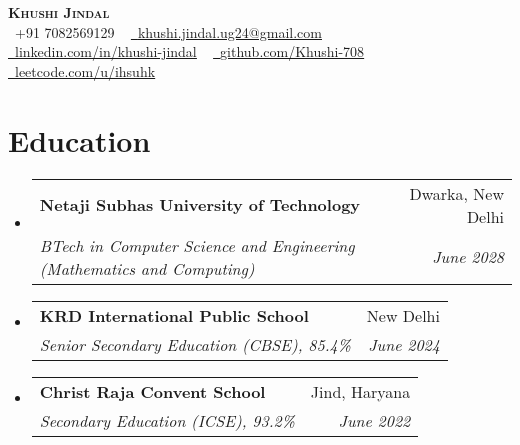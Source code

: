 \documentclass[letterpaper,11pt]{article}
\makeatletter
\newcommand{\resumeSubheading}[4]{
  \vspace{-2pt}\item
    \begin{tabular*}{0.97\textwidth}[t]{l@{\extracolsep{\fill}}r}
      \textbf{#1} & #2 \\
      \textit{\small#3} & \textit{\small #4} \\
    \end{tabular*}\vspace{-7pt}
}
\newcommand{\resumeSubHeadingListStart}{\begin{itemize}[leftmargin=0.15in, label={}]}
\newcommand{\resumeItemListEnd}{\end{itemize}\vspace{-5pt}}
\makeatother
\begin{document}


\begin{center}
  {\textbf{\Huge \scshape Khushi Jindal}} \\ \vspace{5pt}
  \small 
  \raisebox{-0.1\height}\faPhone\ +91 7082569129 ~
  \href{mailto:khushi.jindal.ug24@gmail.com}{\raisebox{-0.2\height}\faEnvelope\  \underline{khushi.jindal.ug24@gmail.com}}  \\ \vspace{3pt} %
  \href{https://www.linkedin.com/in/khushi-jindal}{\raisebox{-0.2\height}\faLinkedin\ \underline{linkedin.com/in/khushi-jindal}} ~
  \href{https://github.com/Khushi-708}{\raisebox{-0.2\height}\faGithub\ \underline{github.com/Khushi-708}} ~
  \href{https://leetcode.com/u/ihsuhk/}{\raisebox{-0.2\height}\faCode\ \underline{leetcode.com/u/ihsuhk}}
  \vspace{-8pt}
\end{center}

\section{Education}
  \resumeSubHeadingListStart
    \resumeSubheading
      {Netaji Subhas University of Technology}{Dwarka, New Delhi}
      {BTech in Computer Science and Engineering (Mathematics and Computing)}{June 2028}
    \resumeSubheading
      {KRD International Public School}{New Delhi}
      {Senior Secondary Education (CBSE), 85.4\%}{June 2024}
    \resumeSubheading
      {Christ Raja Convent School}{Jind, Haryana}
      {Secondary Education (ICSE), 93.2\%}{June 2022}
     
      \resumeItemListEnd





\end{document}
